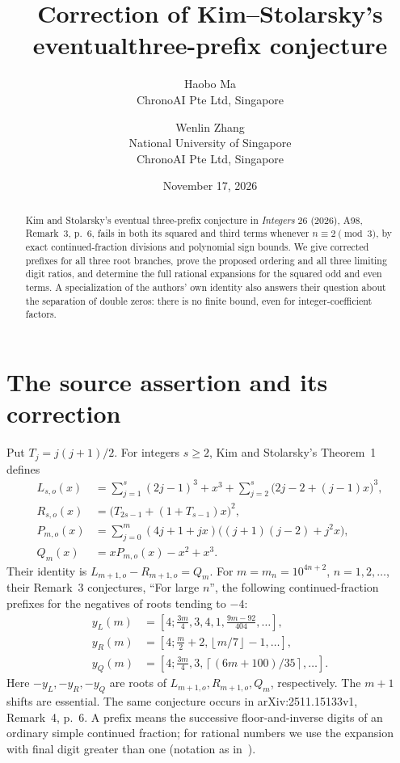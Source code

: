 \documentclass[11pt]{article}
\title{Correction of Kim--Stolarsky's eventual\newline three-prefix conjecture}
\author{Haobo Ma\\\small ChronoAI Pte Ltd, Singapore
\and Wenlin Zhang\\\small National University of Singapore\\\small ChronoAI Pte Ltd, Singapore}
\date{November 17, 2026}
\newcommand{\floor}[1]{\left\lfloor #1\right\rfloor}
\newcommand{\ceil}[1]{\left\lceil #1\right\rceil}
\begin{document}
\maketitle
\begin{abstract}
Kim and Stolarsky's eventual three-prefix conjecture in \emph{Integers} 26
(2026), A98, Remark~3, p.~6, fails in both its squared and third terms whenever
$n\equiv2\pmod3$, by exact continued-fraction divisions and polynomial sign bounds.
We give corrected prefixes for all three root branches, prove the proposed
ordering and all three limiting digit ratios, and determine the full rational
expansions for the squared odd and even terms. A specialization of the authors'
own identity also answers their question about the separation of double zeros:
there is no finite bound, even for integer-coefficient factors.
\end{abstract}

\section{The source assertion and its correction}
Put $T_j=j(j+1)/2$. For integers $s\ge2$, Kim and Stolarsky's
Theorem~1~\cite{KS} defines
\begin{align*}
 L_{s,o}(x)&=\sum_{j=1}^{s}(2j-1)^3+x^3+
       \sum_{j=2}^{s}\bigl(2j-2+(j-1)x\bigr)^3,\\
 R_{s,o}(x)&=\bigl(T_{2s-1}+(1+T_{s-1})x\bigr)^2,\\
 P_{m,o}(x)&=\sum_{j=0}^{m}(4j+1+jx)
                  \bigl((j+1)(j-2)+j^2x\bigr),\\
 Q_m(x)&=xP_{m,o}(x)-x^2+x^3.
\end{align*}
Their identity is $L_{m+1,o}-R_{m+1,o}=Q_m$.
For $m=m_n=10^{4n+2}$, $n=1,2,\ldots$, their Remark~3 conjectures,
``For large $n$'', the following continued-fraction prefixes for the
negatives of roots tending to $-4$:
\begin{align}
 y_L(m)&=\left[4;\frac{3m}{4},3,4,1,\frac{9m-92}{404},\ldots\right],\label{eq:sourceL}\\
 y_R(m)&=\left[4;\frac m2+2,\floor{m/7}-1,\ldots\right],\label{eq:sourceR}\\
 y_Q(m)&=\left[4;\frac{3m}{4},3,\ceil{(6m+100)/35},\ldots\right].\label{eq:sourceQ}
\end{align}
Here $-y_L,-y_R,-y_Q$ are roots of $L_{m+1,o},R_{m+1,o},Q_m$,
respectively. The $m+1$ shifts are essential. The same conjecture occurs
in arXiv:2511.15133v1, Remark~4, p.~6. A prefix means the successive
floor-and-inverse digits of an ordinary simple continued fraction;
for rational numbers we use the expansion with final digit greater than one
(notation as in~\cite{DLMF}).
\end{document}
